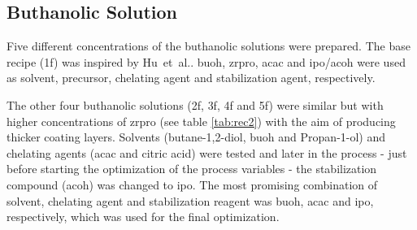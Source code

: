 \subsection{Buthanolic Solution}\label{sec:exp-sol-bu}
Five different concentrations of the buthanolic solutions were prepared.
The base recipe (\gls{1f}) was inspired by Hu~et~al.\cite{Hu2016}.
\Gls{buoh}, \gls{zrpro}, \gls{acac} and \gls{ipo}/\gls{acoh} were used as solvent, precursor, chelating agent and stabilization agent, respectively.

The other four buthanolic solutions (\gls{2f}, \gls{3f}, \gls{4f} and \gls{5f}) were similar 
but with higher concentrations of \gls{zrpro} (see table \ref{tab:rec2})
with the aim of producing thicker coating layers.
Solvents (butane-1,2-diol, \gls{buoh} and Propan-1-ol) and chelating agents 
(\gls{acac} and citric acid) were tested and later in the process - just before 
starting the optimization of the process variables
- the stabilization compound (\gls{acoh}) was changed to \gls{ipo}.
The most promising combination of solvent, chelating agent and stabilization reagent was 
\gls{buoh}, \gls{acac} and \gls{ipo}, respectively, which was used for the final optimization.

